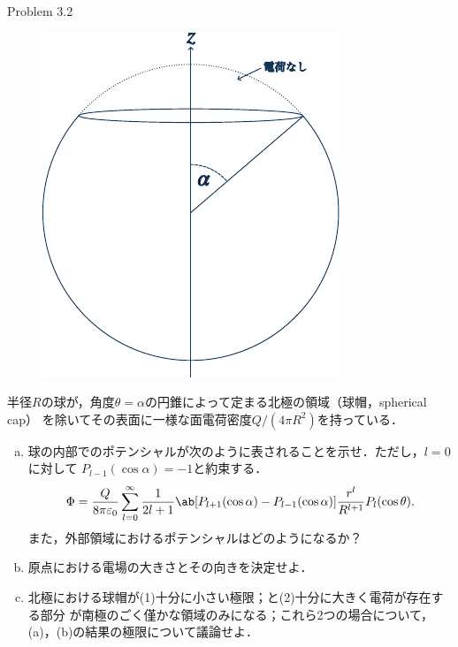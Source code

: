 \clearpage
\begin{bx1}{Problem 3.2}
  \begin{figure}
    \centering
    \includegraphics[width=\linewidth]{fig/Jackson3-2.pdf}%
  \end{figure}%
  半径$R$の球が，角度$\theta =  \alpha$の円錐によって定まる北極の領域（球帽，spherical cap）
  を除いてその表面に一様な面電荷密度$Q / (4\pi R^2)$を持っている．
  \begin{enumerate}[(a)]%
    \item  
  球の内部でのポテンシャルが次のように表されることを示せ．ただし，$l = 0$に対して
      $P_{l-1}(\cos\alpha) = -1$と約束する．
      \begin{gather}%
        \Phi = \frac{Q}{8\pi\eps_0} \sum_{l=0}^{\infty} \frac{1}{2l+1} \ab[
          P_{l+1}(\cos\alpha) - P_{l-1}(\cos\alpha)
        ] \frac{r^l}{R^{l+1}} P_l(\cos\theta).
      \end{gather}%
    また，外部領域におけるポテンシャルはどのようになるか？
  \item 
    原点における電場の大きさとその向きを決定せよ．
  \item
    北極における球帽が(1)十分に小さい極限；と(2)十分に大きく電荷が存在する部分
      が南極のごく僅かな領域のみになる；これら2つの場合について，
      (a)，(b)の結果の極限について議論せよ．
  \end{enumerate}%
\end{bx1}

